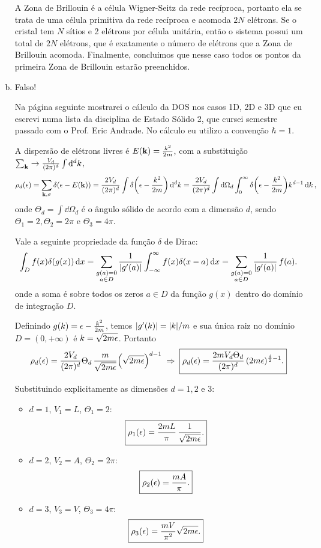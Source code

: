 \documentclass[a4paper,10pt]{article}
\begin{document}
\begin{enumerate}[(a)]
A Zona de Brillouin é a célula Wigner-Seitz da rede recíproca, portanto ela se trata de uma célula primitiva da rede recíproca e acomoda $2 N$ elétrons. Se o cristal tem $N$ sítios e 2 elétrons por célula unitária, então o sistema possui um total de $2N$ elétrons, que é exatamente o número de elétrons que a Zona de Brillouin acomoda. Finalmente, concluimos que nesse caso todos os pontos da primeira Zona de Brillouin estarão preenchidos.

\item Falso!

Na página seguinte mostrarei o cálculo da DOS nos casos 1D, 2D e 3D que eu escrevi numa lista da disciplina de Estado Sólido 2, que cursei semestre passado com o Prof. Eric Andrade. No cálculo eu utilizo a convenção $\hbar = 1$.

\pagebreak

A dispersão de elétrons livres é $E({\vb{k}}) = \frac{k^2}{2m}$, com a substituição $\sum_{{\vb{k}}} \to \frac{V_d}{(2\pi)^d} \int \dd[d]{k}$,
$$
\rho_d(\epsilon) = \sum_{{\vb{k}}, \sigma} \delta(\epsilon - E({\vb{k}})) =
\frac{2V_d}{(2\pi)^d} \int \delta\qty(\epsilon - \frac{k^2}{2m}) \dd[d]{k} =
\frac{2V_d}{(2\pi)^d} \int \dd{\Omega_d} \int_0^\infty \delta\qty(\epsilon - \frac{k^2}{2m}) k^{d-1} \dd{k},
$$
onde $\Theta_d = \int \dd{\Omega_d}$ é o ângulo sólido de acordo com a dimensão $d$, sendo $\Theta_1 = 2, \Theta_2 = 2\pi$ e $\Theta_3 = 4\pi$.

Vale a seguinte propriedade da função $\delta$ de Dirac:
$$
\int_{D} f(x) \delta(g(x)) \dd{x} =
\sum_{\substack{g(a)=0 \\ a \in D}} \frac{1}{\abs{g'(a)}} \int_{-\infty}^{\infty} f(x) \delta(x-a) \dd{x}=
\sum_{\substack{g(a)=0 \\ a \in D}} \frac{1}{\abs{g'(a)}} \, f(a).
$$
onde a soma é sobre todos os zeros $a \in D$ da função $g(x)$ dentro do domínio de integração $D$.

Definindo $g(k) = \epsilon - \frac{k^2}{2m}$, temos $\abs{g'(k)} = \abs{k} / m$ e sua única raiz no domínio $D = (0, +\infty)$ é $k = \sqrt{2m \epsilon}$. Portanto
$$
\rho_d(\epsilon) = \frac{2V_d}{(2\pi)^d} \Theta_d \, \frac{m}{\sqrt{2m\epsilon}}
\qty(\sqrt{2m \epsilon})^{d-1} \; \Rightarrow \;
\boxed{ \rho_d(\epsilon) = \frac{2 m V_d \Theta_d}{(2\pi)^d} \, (2m\epsilon)^{\frac{d}{2}-1}. }
$$

Substituindo explicitamente as dimensões $d = 1, 2$ e $3$:
\begin{itemize}
\item $d = 1$, $V_1 = L$, $\Theta_1 = 2$:
$$
\boxed{\rho_1(\epsilon) = \frac{2 m L}{\pi} \, \frac{1}{\sqrt{2m\epsilon}}.}
$$
\item $d = 2$, $V_2 = A$, $\Theta_2 = 2\pi$:
$$
\boxed{\rho_2(\epsilon) = \frac{m A}{\pi}.}
$$
\item $d = 3$, $V_3 = V$, $\Theta_3 = 4\pi$:
$$
\boxed{\rho_3(\epsilon) = \frac{m V}{\pi^2} \sqrt{2m\epsilon}.}
$$
\end{itemize}


\end{enumerate}
\end{document}
